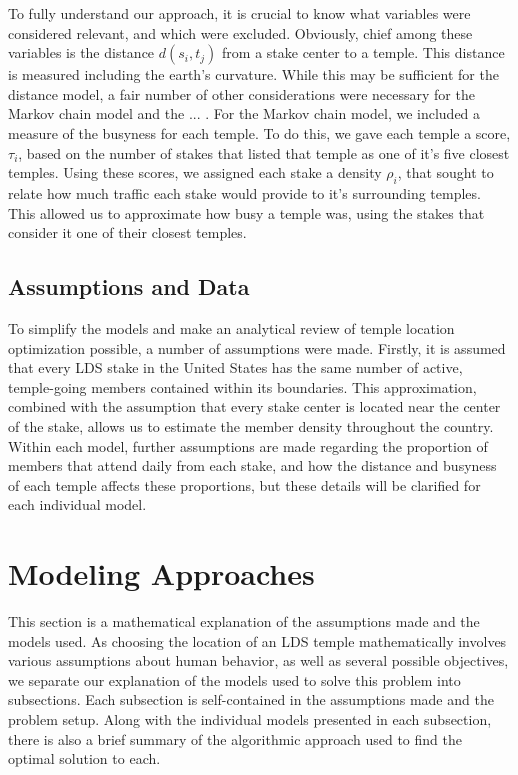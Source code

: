 \documentclass[twoside,twocolumn]{article}
\begin{document}
\noindent To fully understand our approach, it is crucial to know what variables were considered relevant, and which were excluded.
Obviously, chief among these variables is the distance $d(s_{i},t_{j})$ from a stake center to a temple.
This distance is measured including the earth's curvature.
While this may be sufficient for the distance model, a fair number of other considerations were necessary for the Markov chain model and the ... .
For the Markov chain model, we included a measure of the busyness for each temple.
To do this, we gave each temple a score, $\tau_{i}$, based on the number of stakes that listed that temple as one of it's five closest temples.
Using these scores, we assigned each stake a density $\rho_{i}$, that sought to relate how much traffic each stake would provide to it's surrounding temples.
This allowed us to approximate how busy a temple was, using the stakes that consider it one of their closest temples.

\subsection{Assumptions and Data}
To simplify the models and make an analytical review of temple location optimization possible, a number of assumptions were made. Firstly, it is assumed that every LDS stake in the United States has the same number of active, temple-going members contained within its boundaries. This approximation, combined with the assumption that every stake center is located near the center of the stake, allows us to estimate the member density throughout the country. Within each model, further assumptions are made regarding the proportion of members that attend daily from each stake, and how the distance and busyness of each temple affects these proportions, but these details will be clarified for each individual model.

\section{Modeling Approaches}
\label{sec:models}
This section is a mathematical explanation of the assumptions made and the models used. As choosing the location of an LDS temple mathematically involves various assumptions about human behavior, as well as several possible objectives, we separate our explanation of the models used to solve this problem into subsections. Each subsection is self-contained in the assumptions made and the problem setup. Along with the individual models presented in each subsection, there is also a brief summary of the algorithmic approach used to find the optimal solution to each.
\end{document}
